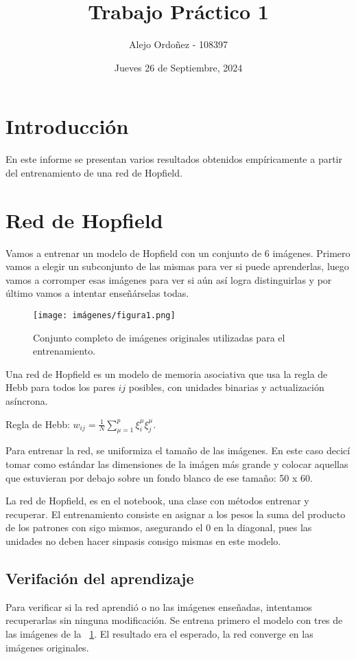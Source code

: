 \documentclass[a4paper,12pt]{article}
\title{Trabajo Práctico 1}
\author{Alejo Ordoñez - 108397}
\date{Jueves 26 de Septiembre, 2024}
\begin{document}
\maketitle

\newpage
\tableofcontents


\newpage
\section{Introducción}

En este informe se presentan varios resultados obtenidos empíricamente a partir del entrenamiento de una red de Hopfield.\textit{}

\section{Red de Hopfield}
Vamos a entrenar un modelo de Hopfield con un conjunto de 6 imágenes. Primero vamos a elegir un subconjunto de las mismas para ver si puede aprenderlas, luego vamos a corromper esas imágenes para ver si aún así logra distinguirlas y por último vamos a intentar enseñárselas todas.

\begin{figure}[h]
    \centering
    \texttt{[image: imágenes/figura1.png]}
    \caption{Conjunto completo de imágenes originales utilizadas para el entrenamiento.}
    \label{fig:figura1}
\end{figure}

Una red de Hopfield es un modelo de memoria asociativa que usa la regla de Hebb para todos los pares $ij$ posibles, con unidades binarias y actualización asíncrona.

Regla de Hebb: $w_{ij} = \frac{1}{N} \sum_{\mu=1}^{p} \xi_{i}^{\mu} \xi_{j}^{\mu}$.

Para entrenar la red, se uniformiza el tamaño de las imágenes. En este caso decicí tomar como estándar las dimensiones de la imágen más grande y colocar aquellas que estuvieran por debajo sobre un fondo blanco de ese tamaño: 50 x 60.

La red de Hopfield, es en el notebook, una clase con métodos entrenar y recuperar. El entrenamiento consiste en asignar a los pesos la suma del producto de los patrones con sigo mismos, asegurando el 0 en la diagonal, pues las unidades no deben hacer sinpasis consigo mismas en este modelo.

\subsection{Verifación del aprendizaje}
Para verificar si la red aprendió o no las imágenes enseñadas, intentamos recuperarlas sin ninguna modificación. Se entrena primero el modelo con tres de las imágenes de la ~\ref{fig:figura1}. El resultado era el esperado, la red converge en las imágenes originales.
\end{document}
